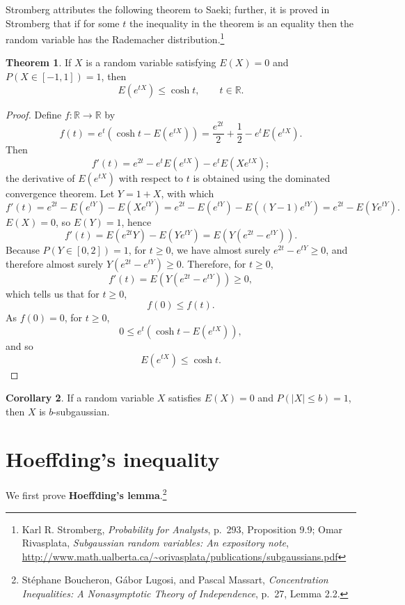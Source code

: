 \documentclass{article}
\theoremstyle{definition}
\newtheorem{theorem}{Theorem}
\newtheorem{corollary}[theorem]{Corollary}
\theoremstyle{definition}
\begin{document}
Stromberg attributes the following theorem to Saeki;
further, it is proved in Stromberg that if for some $t$ the inequality in the theorem is an equality then
the random variable has the Rademacher distribution.\footnote{Karl  R. Stromberg,
{\em Probability for Analysts}, p.~293, Proposition 9.9;
Omar Rivasplata, {\em Subgaussian random variables:
An expository note},
\url{http://www.math.ualberta.ca/~orivasplata/publications/subgaussians.pdf}}

\begin{theorem}
If $X$ is a random variable satisfying $E(X)=0$ and $P(X \in [-1,1])=1$, then
\[
E(e^{tX}) \leq \cosh t, \qquad t \in \mathbb{R}.
\]
\end{theorem}
\begin{proof}
Define $f:\mathbb{R} \to \mathbb{R}$ by
\[
f(t)  =e^t \left(\cosh t - E(e^{tX})\right) = \frac{e^{2t}}{2} + \frac{1}{2} - e^t  E(e^{tX}).
\]
Then
\[
f'(t) = e^{2t} - e^t E(e^{tX})  - e^t E(Xe^{tX});
\]
the derivative of $E(e^{tX})$ with respect to $t$ is obtained using the dominated convergence theorem.
Let  $Y=1+X$, with which
\[
f'(t) = e^{2t} -E(e^{tY}) - E(Xe^{tY})
=e^{2t}-E(e^{tY}) - E((Y-1)e^{tY})
=e^{2t}-E(Ye^{tY}).
\]
$E(X)=0$, so $E(Y)=1$, hence
\[
f'(t) = E(e^{2t}Y)-E(Ye^{tY})=E(Y(e^{2t}-e^{tY})).
\]
Because $P(Y \in [0,2])=1$, for $t \geq 0$, we have almost surely $e^{2t}-e^{tY} \geq 0$, and therefore almost surely
$Y(e^{2t}-e^{tY}) \geq 0$. 
Therefore, for $t \geq 0$,
\[
f'(t)=E(Y(e^{2t}-e^{tY})) \geq 0,
\]
which tells us that for $t \geq 0$,
\[
f(0) \leq f(t).
\]
As $f(0)=0$,  for $t \geq 0$,
\[
0 \leq e^t \left(\cosh t - E(e^{tX})\right),
\]
and so
\[
E(e^{tX}) \leq \cosh t.
\]
\end{proof}

\begin{corollary}
If a random variable $X$ satisfies $E(X)=0$ and
$P(|X| \leq b)=1$, then $X$ is $b$-subgaussian.
\end{corollary}


\section{Hoeffding's inequality}
We first prove \textbf{Hoeffding's lemma}.\footnote{St\'ephane Boucheron, G\'abor Lugosi, and
Pascal Massart, {\em Concentration Inequalities: A Nonasymptotic Theory of Independence}, p.~27, Lemma 2.2.}
\end{document}
